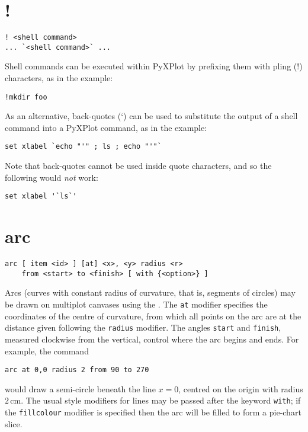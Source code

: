 \section{!}\indcmd{!}

\begin{verbatim}
! <shell command>
... `<shell command>` ...
\end{verbatim}

Shell commands can be executed within PyXPlot by prefixing them with
pling (!) characters, as in the example:

\begin{verbatim}
!mkdir foo
\end{verbatim}

\noindent As an alternative, back-quotes (`) can be used to substitute the
output of a shell command into a PyXPlot command, as in the example:

\begin{verbatim}
set xlabel `echo "'" ; ls ; echo "'"`
\end{verbatim}

\noindent Note that back-quotes cannot be used inside quote characters, and so
the following would \textit{not} work:

\begin{verbatim}
set xlabel '`ls`'
\end{verbatim}


\section{arc}

\begin{verbatim}
arc [ item <id> ] [at] <x>, <y> radius <r>
    from <start> to <finish> [ with {<option>} ]
\end{verbatim}

Arcs (curves with constant radius of curvature, that is, segments of circles)
may be drawn on multiplot canvases using the .  The {\tt at}
modifier specifies the coordinates of the centre of curvature, from which all
points on the arc are at the distance given following the {\tt radius} modifier.
The angles {\tt start} and {\tt finish}, measured clockwise from the vertical,
control where the arc begins and ends.  For example, the command

\begin{verbatim}
arc at 0,0 radius 2 from 90 to 270
\end{verbatim}

\noindent would draw a semi-circle beneath the line $x=0$, centred on the
origin with radius $2\,\mathrm{cm}$.  The usual style modifiers for lines may
be passed after the keyword {\tt with}; if the {\tt fillcolour} modifier is
specified then the arc will be filled to form a pie-chart slice.

